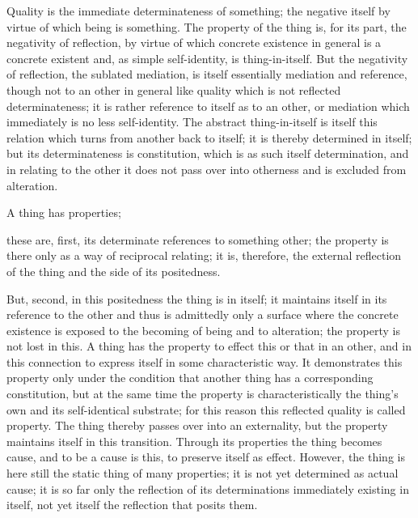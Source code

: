 Quality is the immediate determinateness of something;
the negative itself by virtue of which being is something.
The property of the thing is, for its part,
the negativity of reflection,
by virtue of which concrete existence in
general is a concrete existent
and, as simple self-identity, is thing-in-itself.
But the negativity of reflection, the sublated mediation,
is itself essentially mediation and reference,
though not to an other in general like quality
which is not reflected determinateness;
it is rather reference to itself as to an other,
or mediation which immediately is no less self-identity.
The abstract thing-in-itself is itself this relation
which turns from another back to itself;
it is thereby determined in itself;
but its determinateness is constitution,
which is as such itself determination,
and in relating to the other
it does not pass over into otherness
and  is excluded from alteration.

A thing has properties;

these are, first, its determinate references to something other;
the property is there only as a way of reciprocal relating;
it is, therefore, the external reflection of the thing
and the side of its positedness.

But, second, in this positedness the thing is in itself;
it maintains itself in its reference to the other
and thus is admittedly only a surface
where the concrete existence is exposed to
the becoming of being and to alteration;
the property is not lost in this.
A thing has the property to effect this or that in an other,
and in this connection to express itself in some characteristic way.
It demonstrates this property only under the condition
that another thing has a corresponding constitution,
but at the same time the property is characteristically
the thing's own and its self-identical substrate;
for this reason this reflected quality is called property.
The thing thereby passes over into an externality,
but the property maintains itself in this transition.
Through its properties the thing becomes cause,
and to be a cause is this, to preserve itself as effect.
However, the thing is here still the static thing of many properties;
it is not yet determined as actual cause;
it is so far only the reflection of
its determinations immediately existing in itself,
not yet itself the reflection that posits them.

